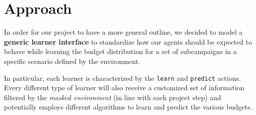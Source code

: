 \section{Approach}
\label{sec:intro_approach}

In order for our project to have a more general outline, we decided to model a \textbf{generic learner interface} to standardize how our agents should be expected to behave while learning the budget distribution for a set of subcampaigns in a specific scenario defined by the environment.

In particular, each learner is characterized by the \texttt{learn} and \texttt{predict} actions.
Every different type of learner will also receive a customized set of information filtered by the \textit{masked environment} (in line with each project step) and potentially employs different algorithms to learn and predict the various budgets.

